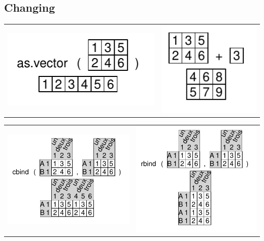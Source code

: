 \documentclass[pdflatex]{article}
\begin{document}
\subsection{Changing}

\begin{tabular}{cc}
\includegraphics{as_vector} & \includegraphics{matrix_operator}\\
\end{tabular}

\begin{tabular}{cc}
\includegraphics{cbind.pdf} & \includegraphics{rbind.pdf}\\
\end{tabular}
\end{document}
